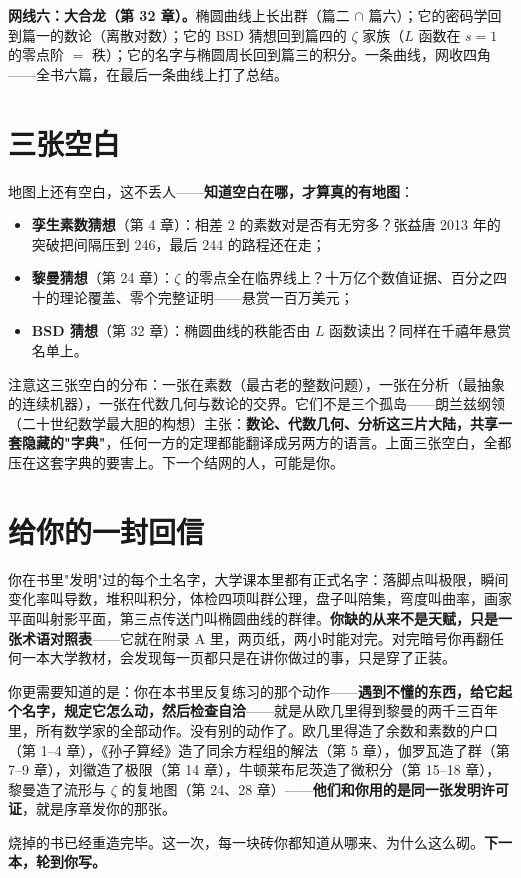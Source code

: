 \textbf{网线六：大合龙（第 32 章）。}椭圆曲线上长出群（篇二 $\cap$ 篇六）；它的密码学回到篇一的数论（离散对数）；它的 BSD 猜想回到篇四的 $\zeta$ 家族（$L$ 函数在 $s=1$ 的零点阶 $=$ 秩）；它的名字与椭圆周长回到篇三的积分。一条曲线，网收四角——全书六篇，在最后一条曲线上打了总结。

\section*{三张空白}

地图上还有空白，这不丢人——\textbf{知道空白在哪，才算真的有地图}：

\begin{itemize}
  \item \textbf{孪生素数猜想}（第 4 章）：相差 $2$ 的素数对是否有无穷多？张益唐 2013 年的突破把间隔压到 $246$，最后 $244$ 的路程还在走；
  \item \textbf{黎曼猜想}（第 24 章）：$\zeta$ 的零点全在临界线上？十万亿个数值证据、百分之四十的理论覆盖、零个完整证明——悬赏一百万美元；
  \item \textbf{BSD 猜想}（第 32 章）：椭圆曲线的秩能否由 $L$ 函数读出？同样在千禧年悬赏名单上。
\end{itemize}

注意这三张空白的分布：一张在素数（最古老的整数问题），一张在分析（最抽象的连续机器），一张在代数几何与数论的交界。它们不是三个孤岛——朗兰兹纲领（二十世纪数学最大胆的构想）主张：\textbf{数论、代数几何、分析这三片大陆，共享一套隐藏的"字典"}，任何一方的定理都能翻译成另两方的语言。上面三张空白，全都压在这套字典的要害上。下一个结网的人，可能是你。

\section*{给你的一封回信}

你在书里"发明"过的每个土名字，大学课本里都有正式名字：落脚点叫极限，瞬间变化率叫导数，堆积叫积分，体检四项叫群公理，盘子叫陪集，弯度叫曲率，画家平面叫射影平面，第三点传送门叫椭圆曲线的群律。\textbf{你缺的从来不是天赋，只是一张术语对照表}——它就在附录 A 里，两页纸，两小时能对完。对完暗号你再翻任何一本大学教材，会发现每一页都只是在讲你做过的事，只是穿了正装。

你更需要知道的是：你在本书里反复练习的那个动作——\textbf{遇到不懂的东西，给它起个名字，规定它怎么动，然后检查自洽}——就是从欧几里得到黎曼的两千三百年里，所有数学家的全部动作。没有别的动作了。欧几里得造了余数和素数的户口（第 1--4 章），《孙子算经》造了同余方程组的解法（第 5 章），伽罗瓦造了群（第 7--9 章），刘徽造了极限（第 14 章），牛顿莱布尼茨造了微积分（第 15--18 章），黎曼造了流形与 $\zeta$ 的复地图（第 24、28 章）——\textbf{他们和你用的是同一张发明许可证}，就是序章发你的那张。

烧掉的书已经重造完毕。这一次，每一块砖你都知道从哪来、为什么这么砌。\textbf{下一本，轮到你写。}
